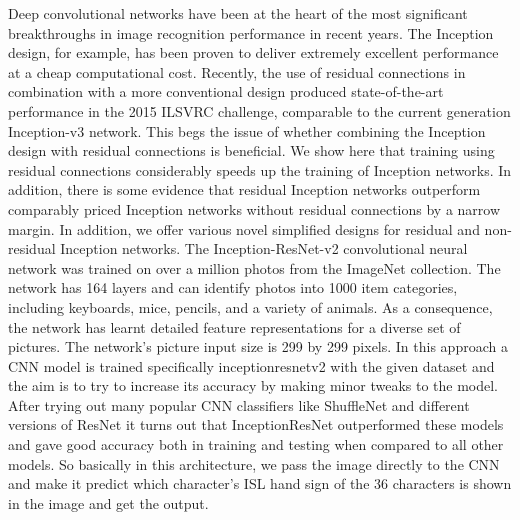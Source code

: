 \documentclass[12pt,a4paper]{report}
\begin{document}
Deep convolutional networks have been at the heart of the most significant breakthroughs in image recognition performance in recent years. The Inception design, for example, has been proven to deliver extremely excellent performance at a cheap computational cost. Recently, the use of residual connections in combination with a more conventional design produced state-of-the-art performance in the 2015 ILSVRC challenge, comparable to the current generation Inception-v3 network. This begs the issue of whether combining the Inception design with residual connections is beneficial. We show here that training using residual connections considerably speeds up the training of Inception networks. In addition, there is some evidence that residual Inception networks outperform comparably priced Inception networks without residual connections by a narrow margin. In addition, we offer various novel simplified designs for residual and non-residual Inception networks. The Inception-ResNet-v2 convolutional neural network was trained on over a million photos from the ImageNet collection. The network has 164 layers and can identify photos into 1000 item categories, including keyboards, mice, pencils, and a variety of animals. As a consequence, the network has learnt detailed feature representations for a diverse set of pictures. The network's picture input size is 299 by 299 pixels. In this approach a CNN model is trained specifically inceptionresnetv2 with the given dataset and the aim is to try to increase its accuracy by making minor tweaks to the model. After trying out many popular CNN classifiers like ShuffleNet and different versions of ResNet it turns out that InceptionResNet outperformed these models and gave good accuracy both in training and testing when compared to all other models. So basically in this architecture, we pass the image directly to the CNN and make it predict which character's ISL hand sign of the 36 characters is shown in the image and get the output.
\end{document}
